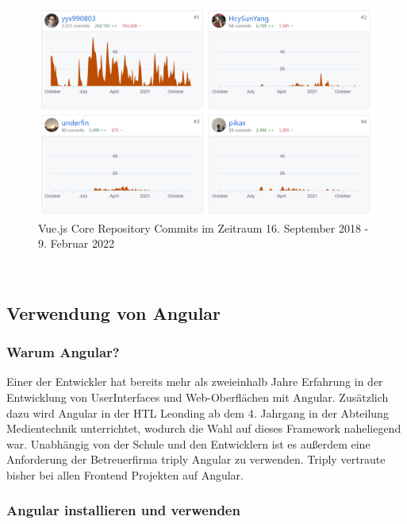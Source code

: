 \begin{figure}[hbt!]
    \centering
    \includegraphics[scale=0.8]{pics/vue_contributions}
    \caption{Vue.js Core Repository Commits im Zeitraum 16. September 2018 - 9. Februar 2022~\cite{VueJSContribution}}
    \label{fig:vue_contributions}
\end{figure}

~\cite{best-frontend-frameworks, best-frontend-framework-2022, angular-vs-react-vs-vue}

\subsection{Verwendung von Angular}

\subsubsection{Warum Angular?}
Einer der Entwickler hat bereits mehr als zweieinhalb Jahre Erfahrung in der Entwicklung von UserInterfaces und Web-Oberflächen mit Angular.
Zusätzlich dazu wird Angular in der HTL Leonding ab dem 4. Jahrgang in der Abteilung Medientechnik unterrichtet, wodurch
die Wahl auf dieses Framework naheliegend war.
Unabhängig von der Schule und den Entwicklern ist es außerdem eine Anforderung der Betreuerfirma triply Angular zu verwenden.
Triply vertraute bisher bei allen Frontend Projekten auf Angular.

\subsubsection{Angular installieren und verwenden}

